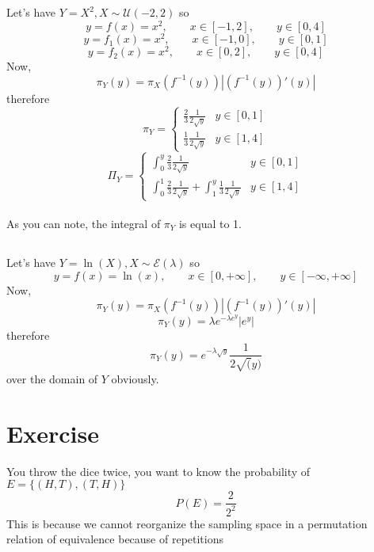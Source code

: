\documentclass[12pt]{article}
\begin{document}
\subsection{}
Let's have $Y=X^2, X\sim \mathcal{U}(-2,2)$ so 
$$y=f(x)=x^2,\qquad x\in[-1,2],\qquad y\in[0,4]$$
$$y=f_1(x)=x^2,\qquad x\in[-1,0],\qquad y\in[0,1]$$
$$y=f_2(x)=x^2,\qquad x\in[0,2],\qquad y\in[0,4]$$
Now, $$\pi_Y(y)=\pi_X(f^{-1}(y))|(f^{-1}(y))'(y)|$$
therefore
\begin{equation}
  \pi_{Y} =
    \begin{cases}
      \frac{2}{3}\frac{1}{2\sqrt{y}}& y\in[0,1]\\
      \frac{1}{3}\frac{1}{2\sqrt{y}} & y\in[1,4]
    \end{cases}
\end{equation}
\begin{equation}
  \Pi_{Y} =
    \begin{cases}
      \int_0^y\frac{2}{3}\frac{1}{2\sqrt{y}}& y\in[0,1]\\
      \int_0^1\frac{2}{3}\frac{1}{2\sqrt{y}}+\int_1^y\frac{1}{3}\frac{1}{2\sqrt{y}} & y\in[1,4]
    \end{cases}
\end{equation}
\\
As you can note, the integral of $\pi_Y$ is equal to 1.
\subsection{}
Let's have $Y=\ln(X), X\sim \mathcal{E}(\lambda)$ so 
$$y=f(x)=\ln(x),\qquad x\in[0,+\infty],\qquad y\in[-\infty,+\infty]$$
Now, $$\pi_Y(y)=\pi_X(f^{-1}(y))|(f^{-1}(y))'(y)|$$
$$\pi_Y(y)=\lambda e^{-\lambda e^y}|e^y|$$
therefore
$$\pi_Y(y) = e^{-\lambda \sqrt{y}}\frac{1}{2\sqrt(y)}$$
over the domain of $Y$ obviously.
\clearpage

\section{Exercise}
You throw the dice twice, you want to know the probability of $E=\{(H,T),(T,H)\}$
$$P(E)=\frac{2}{2^2}$$
This is because we cannot reorganize the sampling space in a permutation relation of equivalence because of repetitions
\end{document}
